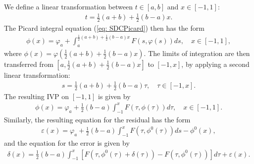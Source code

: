 \documentclass{sfuthesis}
\begin{document}
We define a linear transformation between $t \in [a,b]$ and $x\in [-1,1]$:
\begin{align*}
	t=\frac{1}{2}(a+b) +\frac{1}{2}(b-a)x.
\end{align*}
The Picard integral equation (\ref{eq: SDCPicard}) then has the form 
\begin{align*}
	\phi(x)=\varphi_a+\int_a^{\frac{1}{2}(a+b)+\frac{1}{2}(b-a)x} F(s,\varphi(s))ds, \quad x \in [-1, 1],
\end{align*}
where $\phi(x)=\varphi(\frac{1}{2}(a+b)+\frac{1}{2}(b-a)x)$. 
The limits of integration are then transferred from $[a, \frac{1}{2}(a+b)+\frac{1}{2}(b-a)x]$ to $[-1,x]$, by applying a second linear transformation: 
\begin{align*}
	s=\frac{1}{2}(a+b)+\frac{1}{2}(b-a)\tau, \quad \tau \in [-1,x].
\end{align*}
The resulting IVP on $[-1,1]$ is given by 
\begin{align}
	\phi(x)=\varphi_a +\frac{1}{2}(b-a) \int_{-1}^x F(\tau, \phi(\tau)) d\tau, \quad x \in [-1,1]. \label{eq: SDCPicardCheb}
\end{align}
Similarly, the resulting equation for the residual has the form 
\begin{align}
	\varepsilon(x)=\varphi_a +\frac{1}{2}(b-a) \int_{-1}^x F(\tau, \phi^0(\tau))ds -\phi^0(x), \label{eq: SDCResidualCheb} 
\end{align}
and the equation for the error is given by 
\begin{align}
	\delta(x)=\frac{1}{2}(b-a) \int_{-1}^x \left[F(\tau, \phi^0(\tau)+\delta(\tau))-F(\tau, \phi^0(\tau))\right] d\tau +\varepsilon(x). \label{eq: SDCErrorCheb}
\end{align}
\end{document}
